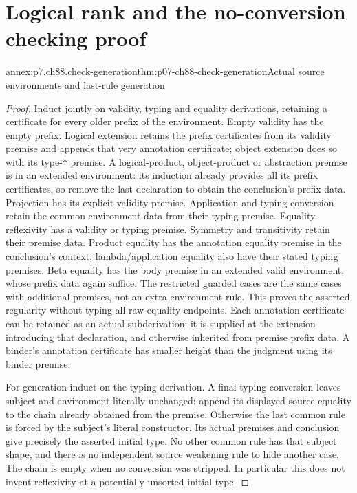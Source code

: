 \section{Logical rank and the no-conversion checking proof}
\label{sec:annex-p07-ch88-checking}

\begin{annexitem}{annex:p7.ch88.check-generation}{thm:p07-ch88-check-generation}{Actual source environments and last-rule generation}
\begin{proof}
Induct jointly on validity, typing and equality derivations, retaining a
certificate for every older prefix of the environment. Empty validity has
the empty prefix. Logical extension retains the prefix certificates from
its validity premise and appends that very annotation certificate; object
extension does so with its type-\(\ast\) premise. A logical-product,
object-product or abstraction premise is in an extended environment:
its induction already provides all its prefix certificates, so remove
the last declaration to obtain the conclusion's prefix data. Projection
has its explicit validity premise. Application and typing conversion
retain the common environment data from their typing premise. Equality
reflexivity has a validity or typing premise. Symmetry and transitivity
retain their premise data. Product equality has the annotation equality
premise in the conclusion's context; lambda/application equality also
have their stated typing premises. Beta equality has the body premise
in an extended valid environment, whose prefix data again suffice.
The restricted guarded cases are the same cases with additional
premises, not an extra environment rule. This proves the asserted
regularity without typing all raw equality endpoints. Each annotation
certificate can be retained as an actual subderivation: it is supplied
at the extension introducing that declaration, and otherwise inherited
from premise prefix data. A binder's annotation certificate has smaller
height than the judgment using its binder premise.

For generation induct on the typing derivation. A final typing
conversion leaves subject and environment literally unchanged: append
its displayed source equality to the chain already obtained from the
premise. Otherwise the last common rule is forced by the subject's
literal constructor. Its actual premises and conclusion give precisely
the asserted initial type. No other common rule has that subject shape,
and there is no independent source weakening rule to hide another case.
The chain is empty when no conversion was stripped. In particular this
does not invent reflexivity at a potentially unsorted initial type.
\end{proof}
\end{annexitem}

